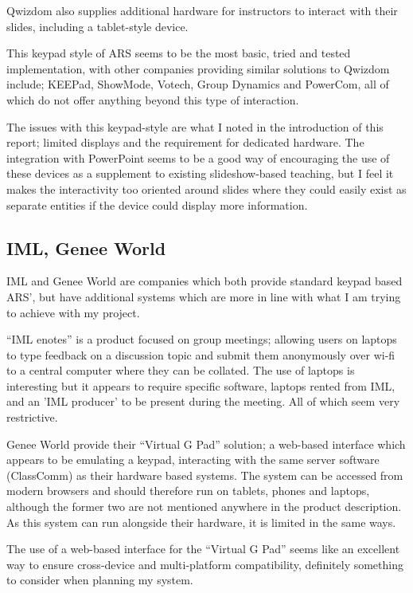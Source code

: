 \documentclass[a4papert,11pt,notitlepage]{article}
\begin{document}
\begin{appendices}
Qwizdom also supplies additional hardware for instructors to interact with their slides, including a tablet-style device.

This keypad style of ARS seems to be the most basic, tried and tested implementation, with other companies providing similar solutions to Qwizdom include; KEEPad, ShowMode, Votech, Group Dynamics and PowerCom, all of which do not offer anything beyond this type of interaction.

The issues with this keypad-style are what I noted in the introduction of this report; limited displays and the requirement for dedicated hardware. The integration with PowerPoint seems to be a good way of encouraging the use of these devices as a supplement to existing slideshow-based teaching, but I feel it makes the interactivity too oriented around slides where they could easily exist as separate entities if the device could display more information.

\subsection{IML, Genee World}
IML\cite{iml:web} and Genee World\cite{genee:web} are companies which both provide standard keypad based ARS', but have additional systems which are more in line with what I am trying to achieve with my project.

``IML enotes'' is a product focused on group meetings; allowing users on laptops to type feedback on a discussion topic and submit them anonymously over wi-fi to a central computer where they can be collated. The use of laptops is interesting but it appears to require specific software, laptops rented from IML, and an 'IML producer' to be present during the meeting. All of which seem very restrictive.

Genee World provide their ``Virtual G Pad'' solution; a web-based interface which appears to be emulating a keypad, interacting with the same server software (ClassComm) as their hardware based systems. The system can be accessed from modern browsers and should therefore run on tablets, phones and laptops, although the former two are not mentioned anywhere in the product description. As this system can run alongside their hardware, it is limited in the same ways.

The use of a web-based interface for the ``Virtual G Pad'' seems like an excellent way to ensure cross-device and multi-platform compatibility, definitely something to consider when planning my system.


\end{appendices}
\end{document}
